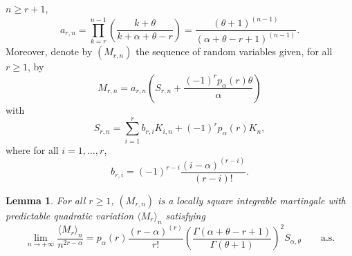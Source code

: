 \documentclass[twoside,12pt]{article}
\newtheorem{lem}[thm]{Lemma}
\begin{document}
$n\geq r+1$,
\begin{equation}
\label{DEFAr}
a_{r,n}=\prod_{k=r}^{n-1}\left(\frac{k+\theta}{k+\alpha+\theta-r}\right)=\frac{(\theta+1)^{(n-1)}}{(\alpha+\theta-r+1)^{(n-1)}}.
\end{equation}
Moreover, denote by $(M_{r,n})$ the sequence of random variables given, for all $r \geq 1$, by
\begin{equation}
\label{DEFMr}
M_{r,n}=a_{r,n}\left(S_{r,n}+ \frac{(-1)^{r} p_{\alpha}(r) \theta}{\alpha}\right)
\end{equation}
with
\begin{equation}
\label{DEFSNr}
S_{r,n}= \sum_{i=1}^{r}b_{r,i}K_{i,n}+(-1)^r p_{\alpha}(r) K_{n},
\end{equation}
where for all $i=1,\ldots,r$, 
\begin{equation}
\label{DEFbr}
b_{r,i}=(-1)^{r-i}\frac{(i-\alpha)^{(r-i)}}{(r-i)!}.
\end{equation}

\begin{lem}
\label{L-KEY}
For all $r \geq 1$, $(M_{r,n})$ is a locally square integrable martingale with predictable quadratic variation $\langle M_r \rangle_{n}$ satisfying
\begin{equation}
\label{LIMIPINMr}
\lim_{n\rightarrow+\infty}\frac{\langle M_{r}\rangle_{n}}{n^{2r-\alpha}}=p_{\alpha}(r)\frac{(r-\alpha)^{(r)}}{r!}\left(\frac{\Gamma(\alpha+\theta-r+1)}{\Gamma(\theta+1)}\right)^{2}S_{\alpha,\theta}\qquad\text{a.s.}
\end{equation}
\end{lem}
\end{document}

